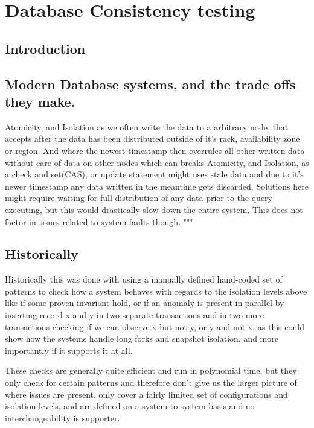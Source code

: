 \documentclass[a4paper,10pt,titlepage]{report}
\begin{document}
    \newpage


    \chapter{Database Consistency testing}


    \section{Introduction}


    \section{Modern Database systems, and the trade offs they make.}

    Atomicity, and Isolation as we often write the data to a arbitrary node, that accepts after the data has been distributed outside of it's rack, availability zone or region. And where the newest timestamp then overrules all other written data without care of data on other nodes which can breaks Atomicity, and Isolation, as a check and set(CAS), or update statement might uses stale data and due to it's newer timestamp any data written in the meantime gets discarded. Solutions here might require waiting for full distribution of any data prior to the query executing, but this would drastically slow down the entire system. This does not factor in issues related to system faults though.
    """


    \section{Historically}

    Historically this was done with using a manually defined hand-coded set of patterns to check how a system behaves with regards to the isolation levels above like if some proven invariant hold, or if an anomaly is present in parallel  by inserting record x and y in two separate transactions and in two more transactions checking if we can observe x but not y, or y and not x, as this could show how the systems handle long forks and snapshot isolation, and more importantly if it supports it at all.

    These checks are generally quite efficient and run in polynomial time, but they only check for certain patterns and therefore don't give us the larger picture of where issues are present.  only cover a fairly limited set of configurations and isolation levels, and are defined on a system to system basis and no interchangeability is supporter.
\end{document}
